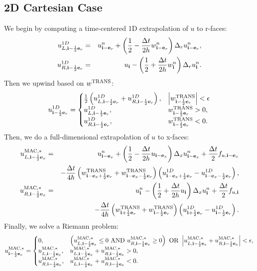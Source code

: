 \documentclass[11pt]{article}
\def\half  {\frac{1}{2}}
\def\dt    {\Delta t}
\def\mac   {\rm MAC}
\def\trans {\rm TRANS}
\def\eb    {{\bf e}}
\def\ib    {{\bf i}}
\begin{document}
\subsection{2D Cartesian Case}
We begin by computing a time-centered 1D extrapolation of $u$ to r-faces:
\begin{eqnarray}
u_{L,\ib-\half\eb_r}^{1D} &=& u_{\ib-\eb_r}^n + \left(\half - \frac{\dt}{2h}w_{\ib-\eb_r}^n\right)\Delta_r u_{\ib-\eb_r}^n, \\
u_{R,\ib-\half\eb_r}^{1D} &=& u_{\ib} - \left(\half + \frac{\dt}{2h}w_{\ib}^n\right)\Delta_r u_{\ib}^n.
\end{eqnarray}
Then we upwind based on $w^{\trans}$:
\begin{equation}
u_{\ib-\half\eb_r}^{1D} =
\begin{cases}
\half\left(u_{L,\ib-\half\eb_r}^{1D} + u_{R,\ib-\half\eb_r}^{1D}\right), & \left|w^{\trans}_{\ib-\half\eb_r}\right| < \epsilon \\
u_{L,\ib-\half\eb_r}^{1D}, & w^{\trans}_{\ib-\half\eb_r} > 0, \\
u_{R,\ib-\half\eb_r}^{1D}, & w^{\trans}_{\ib-\half\eb_r} < 0. \\
\end{cases}
\end{equation}
Then, we do a full-dimensional extrapolation of $u$ to x-faces:
\begin{eqnarray}
u_{L,\ib-\half\eb_x}^{\mac,*} &=& u_{\ib-\eb_x}^n + \left(\half - \frac{\dt}{2h}u_{\ib-\eb_x}\right)\Delta_x u_{\ib-\eb_x}^n + \frac{\dt}{2}f_{u,\ib-\eb_x} \nonumber \\
&& - \frac{\dt}{4h}\left(w_{\ib-\eb_x+\half\eb_r}^{\trans}+w_{\ib-\eb_x-\half\eb_r}^{\trans}\right)\left(u_{\ib-\eb_x+\half\eb_r}^{1D} - u_{\ib-\eb_x-\half\eb_r}^{1D}\right), \\
u_{R,\ib-\half\eb_x}^{\mac,*} &=& u_{\ib}^n - \left(\half + \frac{\dt}{2h}u_{\ib}\right)\Delta_x u_{\ib}^n + \frac{\dt}{2}f_{u,\ib} \nonumber \\
&& - \frac{\dt}{4h}\left(w_{\ib+\half\eb_r}^{\trans}+w_{\ib-\half\eb_r}^{\trans}\right)\left(u_{\ib+\half\eb_r}^{1D} - u_{\ib-\half\eb_r}^{1D}\right).
\end{eqnarray}
Finally, we solve a Riemann problem:
\begin{equation}
u_{\ib-\half\eb_x}^{\mac,*} =
\begin{cases}
0, & \left(u_{L,\ib-\half\eb_x}^{\mac,*} \le 0 ~ {\rm AND} ~ u_{R,\ib-\half\eb_x}^{\mac,*} \ge 0\right) ~ {\rm OR} ~ \left|u_{L,\ib-\half\eb_x}^{\mac,*} + u_{R,\ib-\half\eb_x}^{\mac,*}\right| < \epsilon, \\
u_{L,\ib-\half\eb_x}^{\mac,*}, & u_{L,\ib-\half\eb_x}^{\mac,*} + u_{R,\ib-\half\eb_x}^{\mac,*} > 0, \\
u_{R,\ib-\half\eb_x}^{\mac,*}, & u_{L,\ib-\half\eb_x}^{\mac,*} + u_{R,\ib-\half\eb_x}^{\mac,*} < 0. 
\end{cases}
\end{equation}
\end{document}

